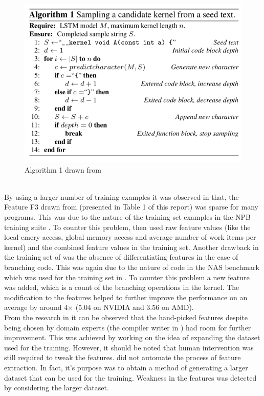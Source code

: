 \documentclass[a4paper,11pt]{article}
\begin{document}
 \begin{figure}[h!]
 	\caption{Algorithm 1 drawn from \cite{sixth}}
 	\begin{center}
 	 \includegraphics[scale=0.6]{Algorithm.png}
 	\end{center}
 \end{figure}\\
  \indent By using a larger number of training examples it was observed in \cite{sixth} that, the Feature F3 drawn from \cite{second} (presented in Table 1 of this report) was sparse for many programs. This was due to the nature of the training set examples in the NPB training suite \cite{nasbenchmark}. To counter this problem, \cite{sixth} then used raw feature values (like the local emery access, global memory access and average number of work items per kernel) and the combined feature values in the training set. Another drawback in the training set of \cite{second} was the absence of differentiating features in the case of branching code. This was again due to the nature of code in the NAS benchmark which was used for the training set in \cite{second}. To counter this problem a new feature was added, which is a count of the branching operations in the kernel.  The modification to the features helped to further improve the performance on an average by around 4$\times$ (5.04 on NVIDIA and 3.56 on AMD).\\
  \indent From the research in \cite{sixth} it can be observed that the hand-picked features despite being chosen by domain experts (the compiler writer in \cite{second}) had room for further improvement. This was achieved by working on the idea of expanding the dataset used for the training. However, it should be noted that human intervention was still required to tweak the features. \cite{sixth} did not automate the process of feature extraction. In fact, it's purpose was to obtain a method of generating a larger dataset that can be used for the training. Weakness in the features was detected by considering the larger dataset.
\end{document}
